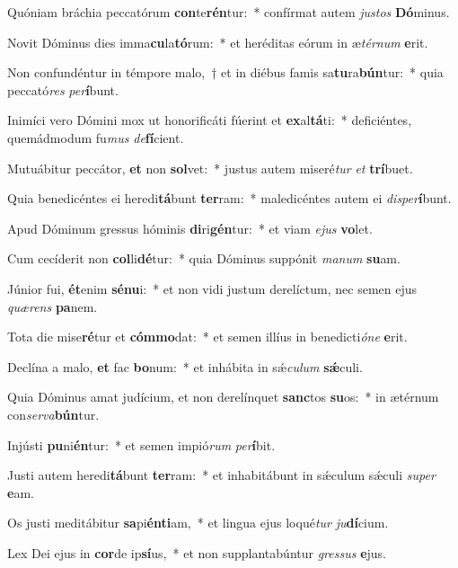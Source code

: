 \item Quóniam bráchia peccatórum \textbf{con}te\textbf{rén}tur:~* confírmat autem \textit{jus}\textit{tos} \textbf{Dó}minus.
\item Novit Dóminus dies imma\textbf{cu}la\textbf{tó}rum:~* et heréditas eórum in æ\textit{tér}\textit{num} \textbf{e}rit.
\item Non confundéntur in témpore malo,~† et in diébus famis sa\textbf{tu}ra\textbf{bún}tur:~* quia peccató\textit{res} \textit{per}\textbf{í}bunt.
\item Inimíci vero Dómini mox ut honorificáti fúerint et \textbf{ex}al\textbf{tá}ti:~* deficiéntes, quemádmodum fu\textit{mus} \textit{de}\textbf{fí}cient.
\item Mutuábitur peccátor, \textbf{et} non \textbf{sol}vet:~* justus autem miseré\textit{tur} \textit{et} \textbf{trí}buet.
\item Quia benedicéntes ei heredi\textbf{tá}bunt \textbf{ter}ram:~* maledicéntes autem ei \textit{dis}\textit{per}\textbf{í}bunt.
\item Apud Dóminum gressus hóminis \textbf{di}ri\textbf{gén}tur:~* et viam \textit{e}\textit{jus} \textbf{vo}let.
\item Cum cecíderit non \textbf{col}li\textbf{dé}tur:~* quia Dóminus suppónit \textit{ma}\textit{num} \textbf{su}am.
\item Júnior fui, \textbf{ét}enim \textbf{sé}\textbf{nu}i:~* et non vidi justum derelíctum, nec semen ejus \textit{quæ}\textit{rens} \textbf{pa}nem.
\item Tota die mise\textbf{ré}tur et \textbf{cóm}\textbf{mo}dat:~* et semen illíus in benedicti\textit{ó}\textit{ne} \textbf{e}rit.
\item Declína a malo, \textbf{et} fac \textbf{bo}num:~* et inhábita in sǽ\textit{cu}\textit{lum} \textbf{sǽ}culi.
\item Quia Dóminus amat judícium, et non derelínquet \textbf{sanc}tos \textbf{su}os:~* in ætérnum con\textit{ser}\textit{va}\textbf{bún}tur.
\item Injústi \textbf{pu}ni\textbf{én}tur:~* et semen impió\textit{rum} \textit{per}\textbf{í}bit.
\item Justi autem heredi\textbf{tá}bunt \textbf{ter}ram:~* et inhabitábunt in sǽculum sǽculi \textit{su}\textit{per} \textbf{e}am.
\item Os justi meditábitur \textbf{sa}pi\textbf{én}\textbf{ti}am,~* et lingua ejus loqué\textit{tur} \textit{ju}\textbf{dí}cium.
\item Lex Dei ejus in \textbf{cor}de ip\textbf{sí}us,~* et non supplantabúntur \textit{gres}\textit{sus} \textbf{e}jus.

